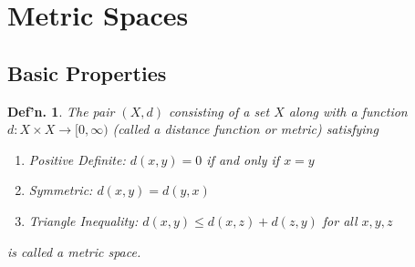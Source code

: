 \documentclass[12pt, a4paper]{book}
\newtheorem{definition}[theorem]{Def'n.}
\theoremstyle{nonumberplain}
\begin{document}
\section{Metric Spaces}
\subsection{Basic Properties}
\begin{definition}
    The pair $(X,d)$ consisting of a set $X$ along with a function $d:X\times X\to[0,\infty)$ (called a distance function or
    metric) satisfying
    \begin{enumerate}
        \item Positive Definite: $d(x,y)=0$ if and only if $x=y$
        \item Symmetric: $d(x,y)=d(y,x)$
        \item Triangle Inequality: $d(x,y)\leq d(x,z)+d(z,y)$ for all $x,y,z$
    \end{enumerate}
    is called a metric space.
\end{definition}
\end{document}
